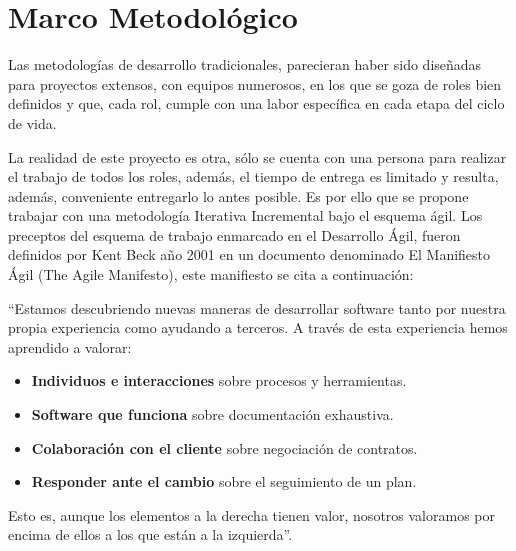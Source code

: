 \chapter{Marco Metodológico}
\label{chap:marcometodologico}

Las metodologías de desarrollo tradicionales, parecieran haber sido diseñadas para proyectos extensos, con equipos numerosos, en los que se goza de roles bien definidos y que, cada rol, cumple con una labor específica en cada etapa del ciclo de vida.

La realidad de este proyecto es otra, sólo se cuenta con una persona para realizar el trabajo de todos los roles, además, el tiempo de entrega es limitado y resulta, además, conveniente entregarlo lo antes posible. Es por ello que se propone trabajar con una metodología Iterativa Incremental bajo el esquema ágil. Los preceptos del esquema de trabajo enmarcado en el Desarrollo Ágil, fueron definidos por Kent Beck año 2001 en un documento denominado El Manifiesto Ágil (The Agile Manifesto), este manifiesto se cita a continuación:

``Estamos descubriendo nuevas maneras de desarrollar software tanto por nuestra propia experiencia como ayudando a terceros. A través de esta experiencia hemos aprendido a valorar:

\begin{itemize}
\item \textbf{Individuos e interacciones} sobre procesos y herramientas.
\item \textbf{Software que funciona} sobre documentación exhaustiva.
\item \textbf{Colaboración con el cliente} sobre negociación de contratos.
\item \textbf{Responder ante el cambio} sobre el seguimiento de un plan.
\end{itemize}

Esto es, aunque los elementos a la derecha tienen valor, nosotros valoramos por encima de ellos a los que están a la izquierda''.

